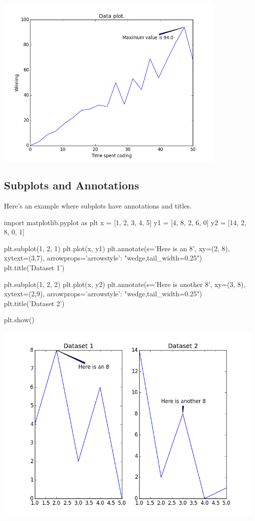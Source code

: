 \documentclass[11pt]{cselabheader}
\begin{document}
\begin{center}
\includegraphics[width=0.85\textwidth]{img/matplotlib_labeled2.png}
\end{center}

\subsection{Subplots and Annotations}

Here's an example where subplots have annotations and titles.

\begin{python3code}
import matplotlib.pyplot as plt
x = [1, 2, 3, 4, 5]
y1 = [4, 8, 2, 6, 0]
y2 = [14, 2, 8, 0, 1]

plt.subplot(1, 2, 1)
plt.plot(x, y1)
plt.annotate(s='Here is an 8', xy=(2, 8), xytext=(3,7),
             arrowprops={'arrowstyle': "wedge,tail_width=0.25"})
plt.title('Dataset 1')

plt.subplot(1, 2, 2)
plt.plot(x, y2)
plt.annotate(s='Here is another 8', xy=(3, 8), xytext=(2,9),
             arrowprops={'arrowstyle': "wedge,tail_width=0.25"})
plt.title('Dataset 2')

plt.show()
\end{python3code}

\begin{center}
\includegraphics[width=\textwidth]{img/matplotlib_labeledsubplot.png}
\end{center}
\end{document}
